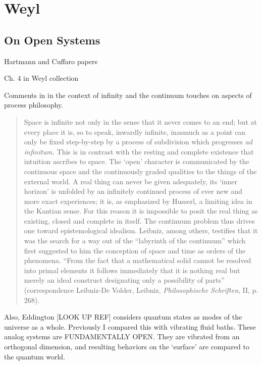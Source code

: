 \section{Weyl}

\subsection{On Open Systems}

Hartmann and Cuffaro papers

Ch. 4 in Weyl collection 

Comments in \cite{Weyl1949} in the context of infinity and the continuum touches on aspects of process philosophy.

\begin{quote}
    Space is infinite not only in the sense that it never comes to an end; but at every place it is, so to speak, inwardly infinite, inasmuch as a point can only be fixed step-by-step by a process of subdivision which progresses \emph{ad infinitum.}  This is in contrast with the resting and complete existence that intuition ascribes to space.  The `open' character is communicated by the continuous space and the continuously graded qualities to the things of the external world.  A real thing can never be given adequately, its `inner horizon' is unfolded by an infinitely continued process of ever new and more exact experiences; it is, as emphasized by Husserl, a limiting idea in the Kantian sense.  For this reason it is impossible to posit the real thing as existing, closed and complete in itself.  The continuum problem thus drives one toward epistemological idealism.  Leibniz, among others, testifies that it was the search for a way out of the ``labyrinth of the continuum'' which first suggested to him the conception of space and time as orders of the phenomena.  ``From the fact that a mathematical solid cannot be resolved into primal elements it follows immediately that it is nothing real but merely an ideal construct designating only a possibility of parts'' (correspondence Leibniz-De Volder, Leibniz, \emph{Philosophische Schriften}, II, p. 268).

    \citep[p. 41]{Weyl1949}
\end{quote}


Also, Eddington [LOOK UP REF] considers quantum states as modes of the universe as a whole.  Previously I compared this with vibrating fluid baths.  These analog systems are FUNDAMENTALLY OPEN.  They are vibrated from an orthogonal dimension, and resulting behaviors on the `surface' are compared to the quantum world.

